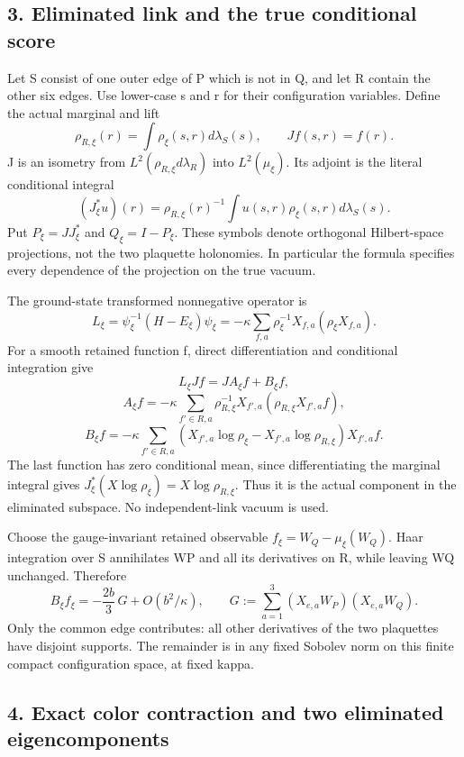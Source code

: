 \documentclass[
  11pt,
]{article}
\begin{document}
\subsection{3. Eliminated link and the true conditional
score}\label{eliminated-link-and-the-true-conditional-score}

Let S consist of one outer edge of P which is not in Q, and let R
contain the other six edges. Use lower-case s and r for their
configuration variables. Define the actual marginal and lift \[
 \rho_{R,\xi}(r)=\int\rho_\xi(s,r)d\lambda_S(s),\qquad Jf(s,r)=f(r).
\] J is an isometry from \(L^2(\rho_{R,\xi}d\lambda_R)\) into
\(L^2(\mu_\xi)\). Its adjoint is the literal conditional integral \[
 (J_\xi^*u)(r)=\rho_{R,\xi}(r)^{-1}
             \int u(s,r)\rho_\xi(s,r)d\lambda_S(s).
\] Put \(P_\xi=JJ_\xi^*\) and \(Q_\xi=I-P_\xi\). These symbols denote
orthogonal Hilbert-space projections, not the two plaquette holonomies.
In particular the formula specifies every dependence of the projection
on the true vacuum.

The ground-state transformed nonnegative operator is \[
 L_\xi=\psi_\xi^{-1}(H-E_\xi)\psi_\xi
       =-\kappa\sum_{f,a}\rho_\xi^{-1}X_{f,a}(\rho_\xi X_{f,a}).
\] For a smooth retained function f, direct differentiation and
conditional integration give \[
 L_\xi Jf=JA_\xi f+B_\xi f,
\] \[
 A_\xi f=-\kappa\sum_{f'\in R,a}
       \rho_{R,\xi}^{-1}X_{f',a}(\rho_{R,\xi}X_{f',a}f),
\] \[
 B_\xi f=-\kappa\sum_{f'\in R,a}
 (X_{f',a}\log\rho_\xi-X_{f',a}\log\rho_{R,\xi})X_{f',a}f.
\] The last function has zero conditional mean, since differentiating
the marginal integral gives
\(J_\xi^*(X\log\rho_\xi)=X\log\rho_{R,\xi}\). Thus it is the actual
component in the eliminated subspace. No independent-link vacuum is
used.

Choose the gauge-invariant retained observable
\(f_\xi=W_Q-\mu_\xi(W_Q)\). Haar integration over S annihilates WP and
all its derivatives on R, while leaving WQ unchanged. Therefore \[
 B_\xi f_\xi=-\frac{2b}{3}\,G+O(b^2/\kappa),\qquad
 G:=\sum_{a=1}^3(X_{e,a}W_P)(X_{e,a}W_Q).
\] Only the common edge contributes: all other derivatives of the two
plaquettes have disjoint supports. The remainder is in any fixed Sobolev
norm on this finite compact configuration space, at fixed kappa.

\subsection{4. Exact color contraction and two eliminated
eigencomponents}\label{exact-color-contraction-and-two-eliminated-eigencomponents}
\end{document}
